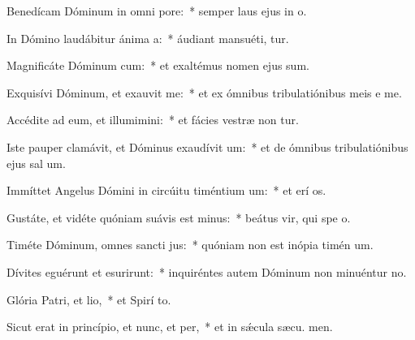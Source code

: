 \item Benedícam Dóminum in omni pore:~* semper laus ejus in  o.
\item In Dómino laudábitur ánima a:~* áudiant mansuéti,  tur.
\item Magnificáte Dóminum cum:~* et exaltémus nomen ejus  sum.
\item Exquisívi Dóminum, et exauvit me:~* et ex ómnibus tribulatiónibus meis e me.
\item Accédite ad eum, et illumimini:~* et fácies vestræ non tur.
\item Iste pauper clamávit, et Dóminus exaudívit um:~* et de ómnibus tribulatiónibus ejus sal um.
\item Immíttet Angelus Dómini in circúitu timéntium um:~* et erí os.
\item Gustáte, et vidéte quóniam suávis est minus:~* beátus vir, qui spe  o.
\item Timéte Dóminum, omnes sancti jus:~* quóniam non est inópia timén um.
\item Dívites eguérunt et esurirunt:~* inquiréntes autem Dóminum non minuéntur  no.
\item Glória Patri, et lio,~* et Spirí to.
\item Sicut erat in princípio, et nunc, et per,~* et in sǽcula sæcu. men.
